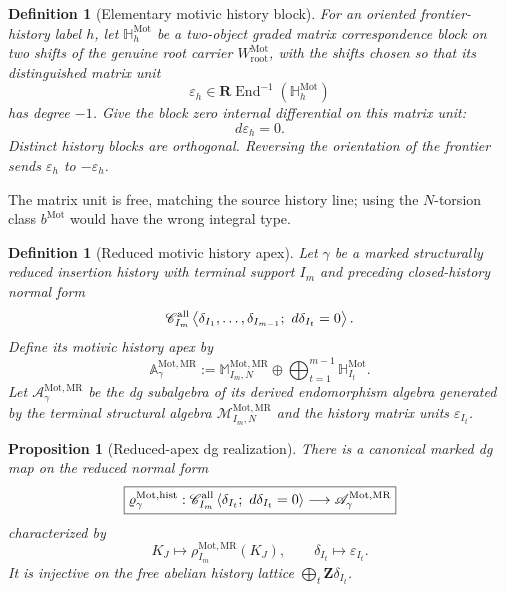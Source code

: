 \documentclass[11pt]{article}
\newtheorem{proposition}[theorem]{Proposition}
\newtheorem{definition}[theorem]{Definition}
\theoremstyle{remark}
\newcommand{\Z}{\mathbf Z}
\newcommand{\REnd}{\mathbf R\!\operatorname{End}}
\newcommand{\Mot}{\mathrm{Mot}}
\newcommand{\rootc}{\mathrm{root}}
\newcommand{\MR}{\mathrm{MR}}
\begin{document}
\begin{definition}[Elementary motivic history block]
\label{P2M-def:v21-motivic-history-block}
For an oriented frontier-history label $h$, let
$\mathbb H_h^{\Mot}$ be a two-object graded matrix correspondence block on two
shifts of the genuine root carrier $W_{\rootc}^{\Mot}$, with the shifts chosen
so that its distinguished matrix unit
\begin{equation}
 \boxed{\varepsilon_h\in
 \REnd^{-1}(\mathbb H_h^{\Mot})}
\end{equation}
has degree $-1$.  Give the block zero internal differential on this matrix unit:
\begin{equation}\label{P2M-eq:v21-history-closed}
 \boxed{d\varepsilon_h=0.}
\end{equation}
Distinct history blocks are orthogonal.  Reversing the orientation of the
frontier sends $\varepsilon_h$ to $-\varepsilon_h$.
\end{definition}

The matrix unit is free, matching the source history line; using the
\(N\)-torsion class \(b^{\Mot}\) would have the wrong integral type.

\begin{definition}[Reduced motivic history apex]
\label{P2M-def:v21-reduced-motivic-history-apex}
Let $\gamma$ be a marked structurally reduced insertion history with terminal
support $I_m$ and preceding closed-history normal form
\[
 \mathscr C_{I_m}^{\rm all}
 \left\langle
   \delta_{I_1},\ldots,\delta_{I_{m-1}};
   \ d\delta_{I_t}=0
 \right\rangle .
\]
Define its motivic history apex by
\begin{equation}
 \boxed{
 \mathbb A_\gamma^{\Mot,\MR}
 :=
 \mathbb M_{I_m,N}^{\Mot,\MR}
 \oplus
 \bigoplus_{t=1}^{m-1}\mathbb H_{I_t}^{\Mot}.}
\end{equation}
Let $\mathscr A_\gamma^{\Mot,\MR}$ be the dg subalgebra of its derived
endomorphism algebra generated by the terminal structural algebra
$\mathscr M_{I_m,N}^{\Mot,\MR}$ and the history matrix units
$\varepsilon_{I_t}$.
\end{definition}

\begin{proposition}[Reduced-apex dg realization]
\label{P2M-prop:v21-reduced-apex-dg-realization}
There is a canonical marked dg map on the reduced normal form
\begin{equation}
 \boxed{
 \varrho_\gamma^{\Mot,\mathrm{hist}}:
 \mathscr C_{I_m}^{\rm all}
 \left\langle\delta_{I_t};\ d\delta_{I_t}=0\right\rangle
 \longrightarrow
 \mathscr A_\gamma^{\Mot,\MR}}
\end{equation}
characterized by
\[
 K_J\longmapsto \rho_{I_m}^{\Mot,\MR}(K_J),
 \qquad
 \delta_{I_t}\longmapsto\varepsilon_{I_t}.
\]
It is injective on the free abelian history lattice
$\bigoplus_t\Z\delta_{I_t}$.
\end{proposition}
\end{document}
